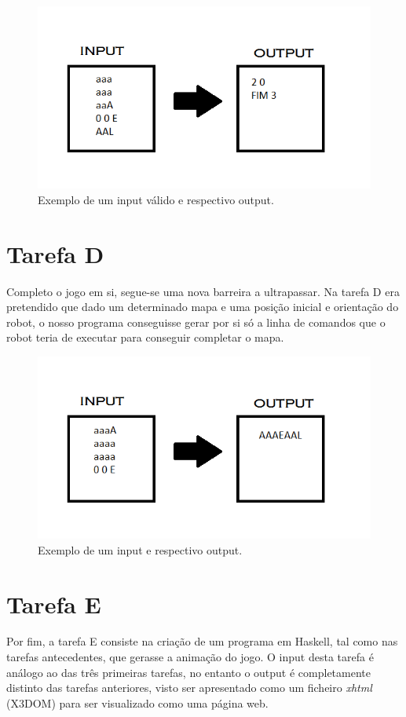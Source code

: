 \documentclass[a4paper,12pt]{report}
\begin{document}
\begin{figure}[!h]
\centering
\includegraphics[scale=0.45]{./RELATORIOEX6.png}
\caption{Exemplo de um input válido e respectivo output.}
\end{figure}

\section{Tarefa D}
Completo o jogo em si, segue-se uma nova barreira a ultrapassar. Na tarefa D era pretendido que dado um determinado mapa e uma posição inicial e orientação do robot, o nosso programa conseguisse gerar por si só a linha de comandos que o robot teria de executar para conseguir completar o mapa. 

\begin{figure}[!h]
\centering
\includegraphics[scale=0.45]{./RELATORIOEX7.png}
\caption{Exemplo de um input e respectivo output.}
\end{figure}

\section{Tarefa E}
Por fim, a tarefa E consiste na criação de um programa em Haskell, tal como nas tarefas antecedentes, que gerasse a animação do jogo. O input desta tarefa é análogo ao das três primeiras tarefas, no entanto o output é completamente distinto das tarefas anteriores, visto ser apresentado como um ficheiro \emph{xhtml} (\textsc{X3DOM}) para ser visualizado como uma página web. 
\end{document}
